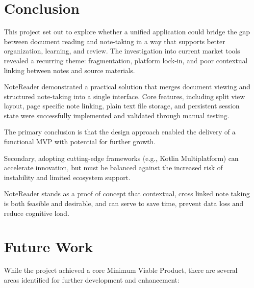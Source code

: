 \section{Conclusion}

This project set out to explore whether a unified application could bridge the gap between document reading and note-taking in a way that supports better organization, learning, and review. The investigation into current market tools revealed a recurring theme: fragmentation, platform lock-in, and poor contextual linking between notes and source materials.

NoteReader demonstrated a practical solution that merges document viewing and structured note-taking into a single interface. Core features, including split view layout, page specific note linking, plain text file storage, and persistent session state   were successfully implemented and validated through manual testing.

The primary conclusion is that the design approach enabled the delivery of a functional MVP with potential for further growth. 

Secondary, adopting cutting-edge frameworks (e.g., Kotlin Multiplatform) can accelerate innovation, but must be balanced against the increased risk of instability and limited ecosystem support.

NoteReader stands as a proof of concept that contextual, cross linked note taking is both feasible and desirable, and can serve to save time, prevent data loss and reduce cognitive load. 

\section{Future Work}

While the project achieved a core Minimum Viable Product, there are several areas identified for further development and enhancement:

